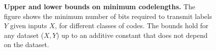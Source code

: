 
\begin{figure}[t!]
    \centering
    \scalebox{0.9}{
    
    } %
    \caption{\textbf{Upper and lower bounds on minimum codelengths.} The figure shows the minimum number of bits required to transmit labels $Y$ given inputs $X$, for different classes of codes. The bounds hold for any dataset ($X,Y$) up to an additive constant that does not depend on the dataset.}
    \label{fig:codelength_comparisons}
\end{figure}
